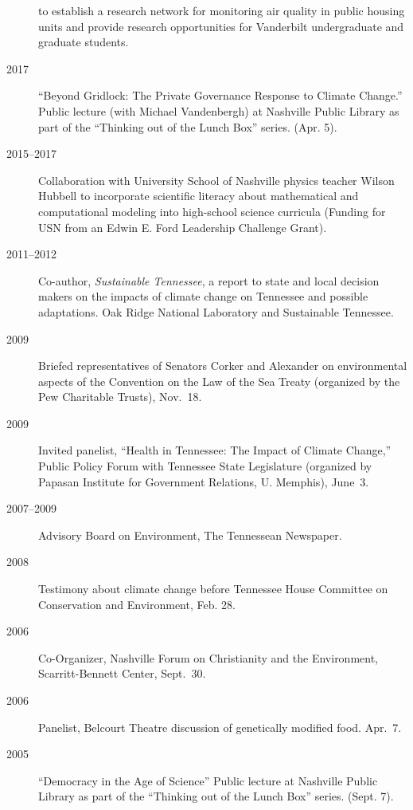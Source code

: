 \documentclass[10pt]{article}
\begin{document}
\begin{description}
            to establish a research network for monitoring air quality in public housing units and provide research opportunities for Vanderbilt undergraduate and graduate students.
            \item[2017] ``Beyond Gridlock: The Private Governance Response to Climate Change.'' Public lecture (with Michael Vandenbergh) at Nashville Public Library as part of the ``Thinking out of the Lunch Box'' series. (Apr. 5).
            \item[2015--2017] Collaboration with University School of Nashville physics teacher Wilson Hubbell to incorporate scientific literacy about mathematical and computational modeling into high-school science curricula (Funding for USN from an Edwin E. Ford Leadership Challenge Grant).
            \item[2011--2012] Co-author, \emph{Sustainable Tennessee}, a report to state and local decision makers on the impacts of climate change on Tennessee and possible adaptations. Oak Ridge National Laboratory and Sustainable Tennessee.
            \item[2009] Briefed representatives of Senators Corker and Alexander on environmental aspects of the Convention on the Law of the Sea Treaty (organized by the Pew Charitable Trusts), Nov.~18.
            \item[2009] Invited panelist, ``Health in Tennessee: The Impact of Climate Change,'' Public Policy Forum with Tennessee State Legislature (organized by Papasan Institute for Government Relations, U. Memphis), June~3.
            \item[2007--2009] Advisory Board on Environment, The Tennessean Newspaper.
            \item[2008] Testimony about climate change before Tennessee House Committee on Conservation and Environment, Feb. 28.
            \item[2006] Co-Organizer, Nashville Forum on Christianity and the Environment, Scarritt-Bennett Center, Sept.~30.
            \item[2006] Panelist, Belcourt Theatre discussion of genetically modified food. Apr.~7.
            \item[2005] ``Democracy in the Age of Science'' Public lecture at Nashville Public Library as part of the ``Thinking out of the Lunch Box'' series. (Sept. 7).
        \end{description}
\end{document}
